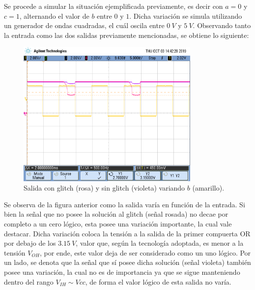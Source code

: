 Se procede a simular la situación ejemplificada previamente, es decir con  $a = 0$ y $c = 1$, alternando el valor de $b$ entre $0$ y $1$. Dicha variación se simula utilizando un generador de ondas cuadradas, el cuál oscila entre $0 \ V$ y $5 \ V$. Observando tanto la entrada como las dos salidas previamente mencionadas, se obtiene lo siguiente: 
\begin{figure}[H]
\centering
	\includegraphics[width=0.8\textwidth, trim = {0 0 0 2cm},clip]{Imagenes/scope_5.png}
	\caption{Salida con glitch (rosa) y sin glitch (violeta) variando $b$ (amarillo).}
	\label{fig:medicion}
\end{figure}

Se observa de la figura anterior como la salida varía en función de la entrada. Si bien la señal que no posee la solución al glitch (señal rosada) no decae por completo a un cero lógico, esta posee una variación importante, la cual vale destacar. Dicha variación coloca la tensión a la salida de la primer compuerta OR por debajo de los $3.15 \ V$, valor que, según la tecnología adoptada, es menor a la tensión $V_{OH}$, por ende, este valor deja de ser considerado como un uno lógico. Por un lado, se denota que la señal que sí posee dicha solución (señal violeta) también posee una variación, la cual no es de importancia ya que se sigue manteniendo dentro del rango $V_{IH} \sim Vcc$, de forma el valor lógico de esta salida no varía.

